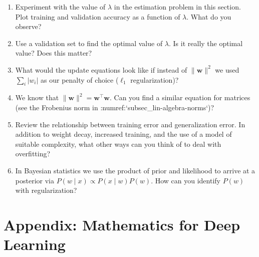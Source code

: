 \documentclass{article}
\begin{document}
\begin{enumerate}
\item Experiment with the value of $\lambda$ in the estimation problem in this section. Plot training and validation accuracy as a function of $\lambda$. What do you observe?

\item Use a validation set to find the optimal value of $\lambda$. Is it really the optimal value? Does this matter?

\item What would the update equations look like if instead of $\|\mathbf{w}\|^2$ we used $\sum_i |w_i|$ as our penalty of choice ($\ell_1$ regularization)?

\item We know that $\|\mathbf{w}\|^2 = \mathbf{w}^\top \mathbf{w}$. Can you find a similar equation for matrices (see the Frobenius norm in :numref:`subsec_lin-algebra-norms`)?

\item Review the relationship between training error and generalization error. In addition to weight decay, increased training, and the use of a model of suitable complexity, what other ways can you think of to deal with overfitting?

\item In Bayesian statistics we use the product of prior and likelihood to arrive at a posterior via $P(w \mid x) \propto P(x \mid w) P(w)$. How can you identify $P(w)$ with regularization?
\end{enumerate}

\newpage
\setcounter{section}{22}
\section{Appendix: Mathematics for Deep Learning}
\end{document}
